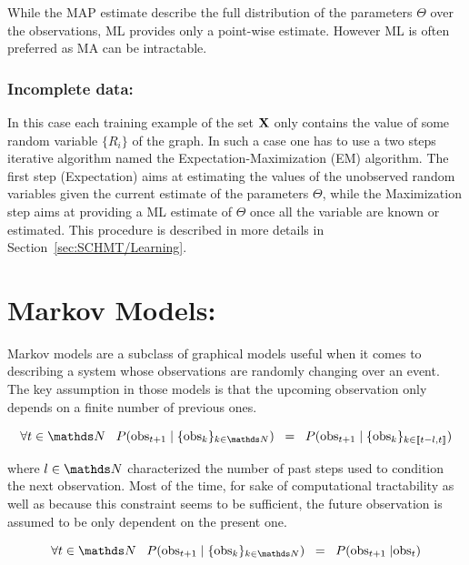 \documentclass[a4paper,11pt]{report}
\begin{document}
      While the MAP estimate describe the full distribution of the parameters $\Theta$ over the observations, ML provides only a point-wise estimate. However ML is often preferred as MA can be intractable.
      
      \subsubsection{Incomplete data:}

				In this case each training example of the set ${\bf X}$  only contains the value of some random variable $\{R_{i}\}$ of the graph. In such a case one has to use a two steps iterative algorithm named the Expectation-Maximization (EM) algorithm. The first step (Expectation) aims at estimating the values of the unobserved random variables given the current estimate of the parameters $\Theta$, while the Maximization step aims at providing a ML estimate of $\Theta$ once all the variable are known or estimated. This procedure is described in more details in Section~\ref{sec:SCHMT/Learning}.
				
  \section{Markov Models:}
    \label{sec:PGMs/MM}
    Markov models are a subclass of graphical models useful when it comes to describing a system whose observations are randomly changing over an event. The key assumption in those models is that the upcoming observation only depends on a finite number of previous ones.
    
    \begin{equation}
      \forall t \in \dsN \;\;\; P(\text{obs}_{t+1} \; | \; \{\text{obs}_{k}\}_{k \in \dsN}) \;\; = \;\; P(\text{obs}_{t+1} \; | \; \{\text{obs}_{k}\}_{k \in \llbracket t-l, t \rrbracket})
      \label{eq:MM assumtion v1}
    \end{equation}
    
    where $l \in \dsN$ characterized the number of past steps used to condition the next observation. Most of the time, for sake of computational tractability as well as because this constraint seems to be sufficient, the future observation is assumed to be only dependent on the present one.  

    \begin{equation}
      \forall t \in \dsN \;\;\; P(\text{obs}_{t+1} \; | \; \{\text{obs}_{k}\}_{k \in \dsN}) \;\; = \;\; P(\text{obs}_{t+1} \; | \text{obs}_{t})
      \label{eq:MM assumtion v2}
    \end{equation}
    
\end{document}
